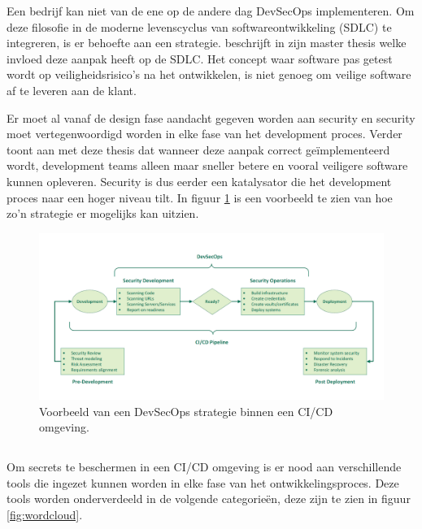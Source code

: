 Een bedrijf kan niet van de ene op de andere dag DevSecOps implementeren. Om deze filosofie in de moderne levenscyclus van softwareontwikkeling (SDLC) te integreren, is er behoefte aan een strategie. \autocite{Jenkins2021} \textcite{Ahmed2019} beschrijft in zijn master thesis welke invloed deze aanpak heeft op de SDLC. Het concept waar software pas getest wordt op veiligheidsrisico's na het ontwikkelen, is niet genoeg om veilige software af te leveren aan de klant. 
\clearpage

Er moet al vanaf de design fase aandacht gegeven worden aan security en security moet vertegenwoordigd worden in elke fase van het development proces. Verder toont \textcite{Ahmed2019} aan met deze thesis dat wanneer deze aanpak correct geïmplementeerd wordt, development teams alleen maar sneller betere en vooral veiligere software kunnen opleveren. Security is dus eerder een katalysator die het development proces naar een hoger niveau tilt. In figuur \ref{fig:schema_DevSecOpsStrategie} is een voorbeeld te zien van hoe zo'n strategie er mogelijks kan uitzien.
\newline

\begin{figure}[H]
  \centering
  \includegraphics[scale=0.30]{graphics/schema_DevSecOpsStrategie.png}
  \caption{\label{fig:schema_DevSecOpsStrategie}Voorbeeld van een DevSecOps strategie binnen een CI/CD omgeving. \autocite{Jenkins2021}}
\end{figure}

\subsection{}
\label{sec:Het gebruik van security tools binnen DevSecOps}
Om secrets te beschermen in een CI/CD omgeving is er nood aan verschillende tools die ingezet kunnen worden in elke fase van het ontwikkelingsproces. Deze tools worden onderverdeeld in de volgende categorieën, deze zijn te zien in figuur \ref{fig:wordcloud}.

